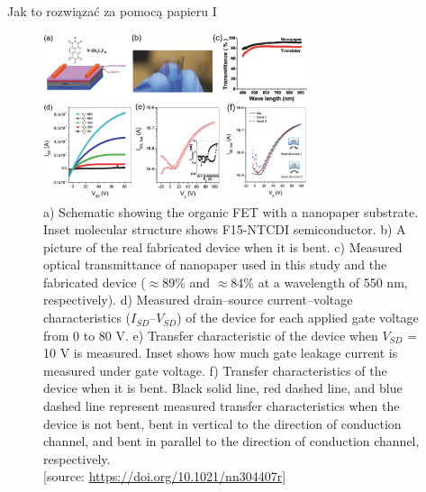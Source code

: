 \documentclass{beamer}
\begin{document}
\begin{frame}{Jak to rozwiązać za pomocą papieru I }
    \begin{figure}
        \centering
        \includegraphics[width=0.7\textwidth]{fig4.jpg}
        \caption{a) Schematic showing the organic FET with a nanopaper substrate. Inset molecular structure shows F15-NTCDI semiconductor. b) A picture of the real fabricated device when it is bent. c) Measured optical transmittance of nanopaper used in this study and the fabricated device ($\approx$89\% and $\approx$84\% at a wavelength of 550 nm, respectively). d) Measured drain–source current–voltage characteristics ($I_{SD}$–$V_{SD}$) of the device for each applied gate voltage from 0 to 80 V. e) Transfer characteristic of the device when $V_{SD}$ = 10 V is measured. Inset shows how much gate leakage current is measured under gate voltage. f) Transfer characteristics of the device when it is bent. Black solid line, red dashed line, and blue dashed line represent measured transfer characteristics when the device is not bent, bent in vertical to the direction of conduction channel, and bent in parallel to the direction of conduction channel, respectively.\\ \typeout{}
        [source: \url{https://doi.org/10.1021/nn304407r}]}
    \end{figure}
\end{frame}
\end{document}
